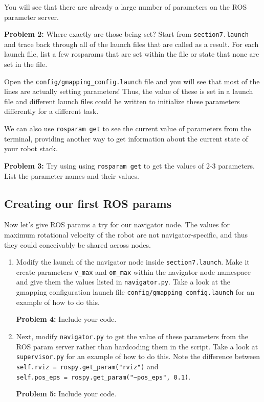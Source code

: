 \documentclass{article}
\begin{document}
You will see that there are already a large number of parameters on the ROS parameter server. 

\textbf{Problem 2: } Where exactly are those being set? Start from \texttt{section7.launch} and trace back through all of the launch files that are called as a result. For each launch file, list a few rosparams that are set within the file or state that none are set in the file.

Open the \texttt{config/gmapping\_config.launch} file and you will see that most of the lines are actually setting parameters! Thus, the value of these is set in a launch file and different launch files could be written to initialize these parameters differently for a different task.

We can also use \texttt{rosparam get} to see the current value of parameters from the terminal, providing another way to get information about the current state of your robot stack. 

\textbf{Problem 3: } Try using using \texttt{rosparam get} to get the values of 2-3 parameters. List the parameter names and their values.

\subsection{Creating our first ROS params}

Now let's give ROS params a try for our navigator node. The values for maximum rotational velocity of the robot are not navigator-specific, and thus they could conceivably be shared across nodes. 
\begin{enumerate}
    \item Modify the launch of the navigator node inside \texttt{section7.launch}. Make it create parameters \texttt{v\_max} and \texttt{om\_max} within the navigator node namespace and give them the values listed in \texttt{navigator.py}. Take a look at the gmapping configuration launch file \texttt{config/gmapping\_config.launch} for an example of how to do this.
    
    \textbf{Problem 4:} Include your code.
    
    \item Next, modify \texttt{navigator.py} to get the value of these parameters from the ROS param server rather than hardcoding them in the script. Take a look at \texttt{supervisor.py} for an example of how to do this. Note the difference between \lstinline{self.rviz = rospy.get_param("rviz")} and \\ \lstinline{self.pos_eps = rospy.get_param("~pos_eps", 0.1)}.
    
    \textbf{Problem 5:} Include your code.
\end{enumerate}  
\end{document}
